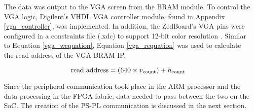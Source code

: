 \par
The data was output to the VGA screen from the BRAM module. To control the VGA logic, Digilent's VHDL VGA controller module, found in Appendix \ref{vga_controller}, was implemented. In addition, the ZedBoard's VGA pins were configured in a constraints file (.xdc) to support 12-bit color resolution \cite{zedboard_datasheet}. Similar to Equation \ref{vga_wequation}, Equation \ref{vga_requation} was used to calculate the read address of the VGA BRAM IP.

\begin{equation}
	\textrm{read address} = (640\times{}v\textsubscript{count})+ h\textsubscript{count}
	\label{vga_requation}
\end{equation}

Since the peripheral communication took place in the ARM processor and the data processing in the FPGA fabric, data needed to pass between the two on the SoC. The creation of the PS-PL communication is discussed in the next section.





